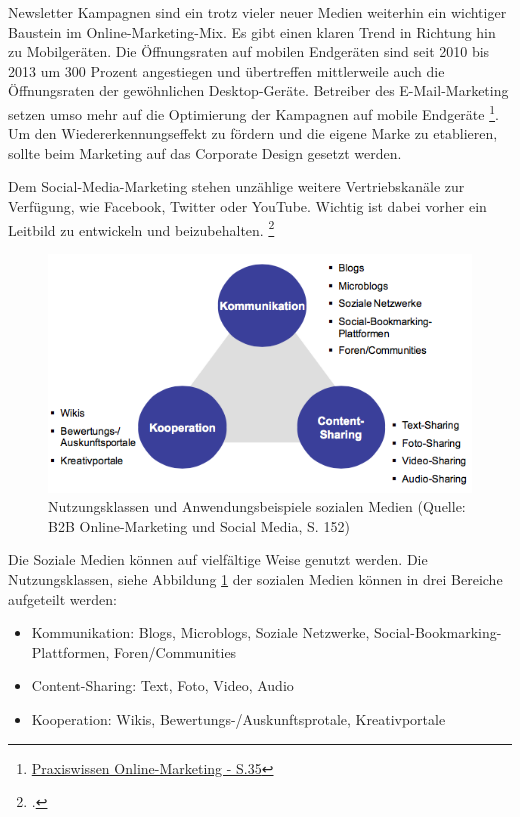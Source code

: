 Newsletter Kampagnen sind ein trotz vieler neuer Medien weiterhin ein wichtiger Baustein im Online-Marketing-Mix. Es gibt einen klaren Trend in Richtung hin zu Mobilgeräten. Die Öffnungsraten auf mobilen Endgeräten sind seit 2010 bis 2013 um 300 Prozent angestiegen und übertreffen mittlerweile auch die Öffnungsraten der gewöhnlichen Desktop-Geräte. Betreiber des E-Mail-Marketing setzen umso mehr auf die Optimierung der Kampagnen auf mobile Endgeräte \footnote{\url{Praxiswissen Online-Marketing - S.35}}. Um den Wiedererkennungseffekt zu fördern und die eigene Marke zu etablieren, sollte beim Marketing auf das Corporate Design gesetzt werden.

Dem Social-Media-Marketing stehen unzählige weitere Vertriebskanäle zur Verfügung, wie Facebook, 
Twitter oder YouTube. Wichtig ist dabei vorher ein Leitbild zu entwickeln und beizubehalten. 
\footcite[8]{hsmerseburg_masterkonzept_2009}

\begin{figure}[h!]
	\centering
	\includegraphics[width=\textwidth]{kapitel/gruppe1_2/bilder/nutzungsklassen}
	\caption{Nutzungsklassen und Anwendungsbeispiele sozialen Medien (Quelle: B2B Online-Marketing und Social Media, S. 152)}
	\label{fig_nutzungsklassen}
\end{figure}

Die Soziale Medien können auf vielfältige Weise genutzt werden. Die Nutzungsklassen, siehe Abbildung \ref{fig_nutzungsklassen} der sozialen Medien können in drei Bereiche aufgeteilt werden:


\begin{itemize}
	\item Kommunikation: Blogs, Microblogs, Soziale Netzwerke, Social-Bookmarking-Plattformen, Foren/Communities
	\item Content-Sharing: Text, Foto, Video, Audio
	\item Kooperation: Wikis, Bewertungs-/Auskunftsprotale, Kreativportale
\end{itemize}

